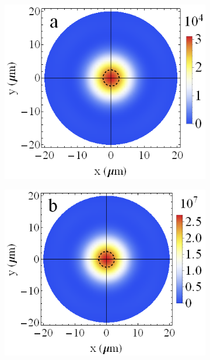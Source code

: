 \documentclass[aps,pra,amsmath,amssymb,onecolumn,superscriptaddress,showpacs,floatfix,]{revtex4-1}
\begin{document}
\begin{figure}[h]
	\centering
	\begin{subfigure}[h]{0.32\linewidth}
		\includegraphics[width=\linewidth]{Fig3a.png}
	\end{subfigure}
	\begin{subfigure}[h]{0.32\linewidth}
		\includegraphics[width=\linewidth]{Fig3b.png}
	\end{subfigure}
	\begin{subfigure}[h]{0.32\linewidth}

\end{subfigure}
\end{figure}
\end{document}
